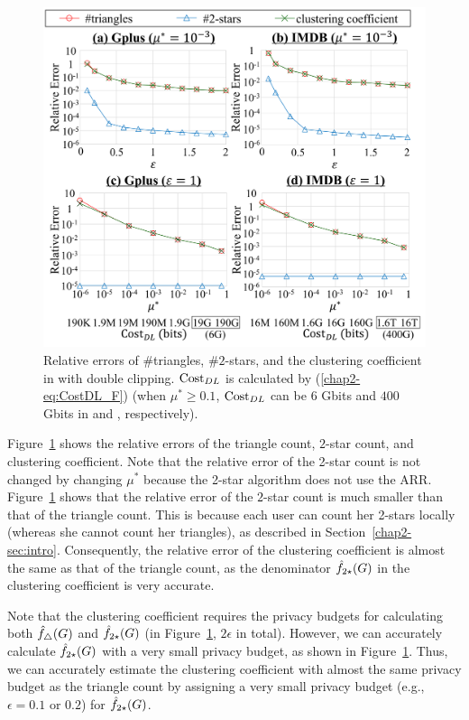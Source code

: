 \begin{figure}[t]
  \centering
  \includegraphics[width=0.99\linewidth]{fig/res5_cluster.pdf}
  \vspace{-4mm}
  \caption{Relative errors of \#triangles, \#$2$-stars, and the clustering coefficient in \AlgTwo{} with double clipping.
  $\mathrm{Cost}_{DL}$ is calculated by (\ref{chap2-eq:CostDL_F})
  (when $\mu^* \geq 0.1$,
  $\mathrm{Cost}_{DL}$ can be $6$ Gbits and $400$ Gbits in \GPlus{} and \IMDB{}, respectively).
  }
  \label{chap2-fig:res5_cluster}
\end{figure}

Figure~\ref{chap2-fig:res5_cluster} shows the relative errors of the triangle count, $2$-star count, and clustering coefficient.
Note that the relative error of the 2-star count is not changed by changing
$\mu^*$
because the 2-star algorithm does not use the ARR.
Figure~\ref{chap2-fig:res5_cluster} shows that the relative error of the $2$-star count is much smaller than that of the triangle count.
This is because each user can count her 2-stars locally (whereas she cannot count her triangles), as described in Section~\ref{chap2-sec:intro}.
Consequently, the relative error of the clustering coefficient is almost the same as that of the triangle count, as the denominator $\hat{f}_{2\star}(G)$ in the clustering coefficient is very accurate.

Note that the clustering coefficient requires the privacy budgets for
calculating both $\hat{f}_\triangle(G)$ and $\hat{f}_{2\star}(G)$
(in Figure~\ref{chap2-fig:res5_cluster}, $2\epsilon$ in total).
However, we can accurately
calculate $\hat{f}_{2\star}(G)$
with a very small privacy budget, as shown in Figure~\ref{chap2-fig:res5_cluster}.
Thus, we can accurately estimate the clustering coefficient with almost the same privacy budget as
the triangle count
by assigning a very small privacy budget (e.g., $\epsilon=0.1$ or $0.2$) for
$\hat{f}_{2\star}(G)$.

